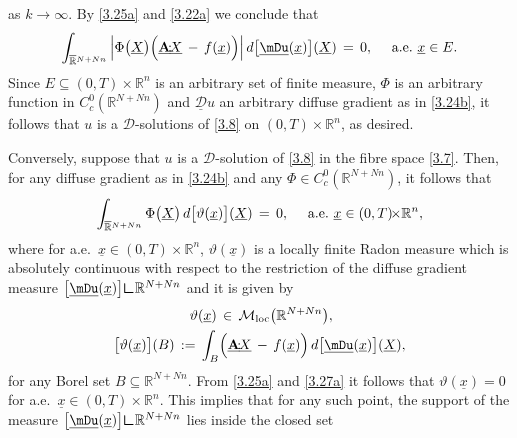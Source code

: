 \documentclass{amsart}
\theoremstyle{definition}
\numberwithin{equation}{section}
\begin{document}
as $k{\rightarrow} \infty$. By \eqref{3.25a} and \eqref{3.22a} we conclude that
\[
\int_{ \smash{\overline{\mathbb{R}}}^{N+Nn} }  \Big|\Phi\big( \underline{X} \big)\Big( {\underline{\textbf{A}}} {\!:\!}  \underline{X}\,-\, f(\underline{x}) \Big) \Big|  \, d\big[\underline\mDu(\underline{x})\big]( \underline{X} )\,=\,0,\ \ \ \text{ a.e.\ }\underline{x}\in E.
\]
Since $E{\subseteq} (0,T) \!{\times} {\mathbb{R}}^n$ is an  arbitrary set of finite measure, $\Phi$ is an arbitrary function in $C^0_c({\mathbb{R}}^{N+Nn})$ and $\underline{\mathcal{D}} u$ an arbitrary diffuse gradient as in \eqref{3.24b}, it follows that $u$ is a ${\mathcal{D}}$-solutions of \eqref{3.8} on $(0,T) \!{\times} {\mathbb{R}}^n$, as desired.

{\medskip}

Conversely, suppose that $u$ is a ${\mathcal{D}}$-solution of \eqref{3.8} in the fibre space \eqref{3.7}. Then, for any diffuse gradient as in \eqref{3.24b} and any $\Phi \in C^0_c({\mathbb{R}}^{N+Nn})$, it follows that
\begin{equation} \label{3.26a}
\int_{ \smash{\overline{\mathbb{R}}}^{N+Nn} }   \Phi\big( \underline{X} \big)   \, d\big[\vartheta (\underline{x})\big]( \underline{X} )\,=\,0,\ \ \ \text{ a.e.\ }\underline{x}\in (0,T) \!{\times} {\mathbb{R}}^n,
\end{equation}
where for a.e.\ $\underline{x}\in (0,T) {\times} {\mathbb{R}}^n$, $\vartheta (\underline{x})$ is a locally finite Radon measure which is absolutely continuous with respect to the restriction of the diffuse gradient measure $\big[ \underline\mDu(\underline{x}) \big]{\text{\LARGE$\llcorner$}} {\mathbb{R}}^{N+Nn}$  and it is given by
\begin{equation} \label{3.27a}
\begin{split}
\vartheta (\underline{x})\, &\in \, {\mathcal{M}}_{\text{loc}}\big({\mathbb{R}}^{N+Nn}\big) ,\\
\big[\vartheta (\underline{x})\big](B)\, :=\, \int_{B}&\Big( {\underline{\textbf{A}}} {\!:\!}  \underline{X}\,-\, f(\underline{x}) \Big)\, d\big[\underline\mDu(\underline{x})\big]( \underline{X} ),
\end{split}
\end{equation}
for any Borel set $B{\subseteq} {\mathbb{R}}^{N+Nn}$. From \eqref{3.25a} and \eqref{3.27a} it follows that $\vartheta (\underline{x})=0$ for a.e.\ $\underline{x}\in (0,T) {\times} {\mathbb{R}}^n$. This implies that for any such point, the support of the measure $\big[ \underline\mDu(\underline{x}) \big]{\text{\LARGE$\llcorner$}} {\mathbb{R}}^{N+Nn}$ lies inside the closed set
\end{document}
